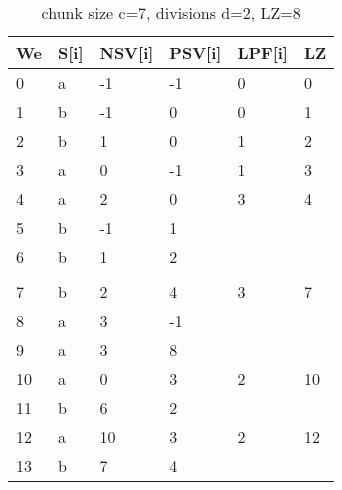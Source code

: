 \begin{table}[h]
\centering
\begin{tabular}{@{}llllll@{}}
\toprule
We  & S{[}i{]} & NSV{[}i{]} & PSV{[}i{]} & LPF{[}i{]} & LZ \\ \midrule
0  & a        & -1         & -1         & 0          & 0  \\
1  & b        & -1         & 0          & 0          & 1  \\
2  & b        & 1          & 0          & 1          & 2  \\
3  & a        & 0          & -1         & 1          & 3  \\
4  & a        & 2          & 0          & 3          & 4  \\
5  & b        & -1         & 1          &            &    \\
6  & b        & 1          & 2          &            &    \\
   &          &            &            &            &    \\
7  & b        & 2          & 4          & 3          & 7  \\
8  & a        & 3          & -1         &            &    \\
9  & a        & 3          & 8          &            &    \\
10 & a        & 0          & 3          & 2          & 10 \\
11 & b        & 6          & 2          &            &    \\
12 & a        & 10         & 3          & 2          & 12 \\
13 & b        & 7          & 4          &            &    \\ \bottomrule
\end{tabular}
\caption{chunk size c=7, divisions d=2, LZ=8}
\label{tab:example7}
\end{table}

